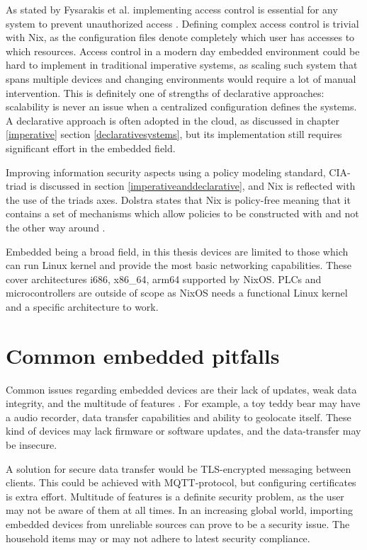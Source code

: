 As stated by Fysarakis et al. implementing access control is essential
for any system to prevent unauthorized access
\cite{fysarakis2014embedded}. Defining complex access control is
trivial with Nix, as the configuration files denote completely which
user has accesses to which resources. Access control in a modern day
embedded environment could be hard to implement in traditional
imperative systems, as scaling such system that spans multiple devices
and changing environments would require a lot of manual
intervention. This is definitely one of strengths of declarative
approaches: scalability is never an issue when a centralized
configuration defines the systems. A declarative approach is often
adopted in the cloud, as discussed in chapter \ref{imperative}
section \ref{declarativesystems}, but its implementation still
requires significant effort in the embedded field.

Improving information security aspects using a policy
modeling standard, CIA-triad is discussed in section
\ref{imperativeanddeclarative}, and Nix is reflected with the use of
the triads axes. Dolstra states that Nix is policy-free meaning that
it contains a set of mechanisms which allow policies to be constructed
with and not the other way around \cite{dolstra2004nix}.

Embedded being a broad field, in this thesis devices are limited to
those which can run Linux kernel and provide the most basic networking
capabilities. These cover architectures i686, x86\_64, arm64 supported
by NixOS. PLCs and microcontrollers are outside of scope as NixOS
needs a functional Linux kernel and a specific architecture to work.

\section{Common embedded pitfalls}

Common issues regarding embedded devices are their lack of updates,
weak data integrity, and the multitude of features
\cite{kemmerer2003cybersecurity, fysarakis2014embedded}. For example,
a toy teddy bear may have a audio recorder, data transfer capabilities
and ability to geolocate itself. These kind of devices may lack
firmware or software updates, and the data-transfer may be insecure.

A solution for secure data transfer would be TLS-encrypted messaging
between clients. This could be achieved with MQTT-protocol, but
configuring certificates is extra effort. Multitude of features is a
definite security problem, as the user may not be aware of them at all
times. In an increasing global world, importing embedded devices from
unreliable sources can prove to be a security issue. The household
items may or may not adhere to latest security
compliance. \cite{fysarakis2014embedded}

